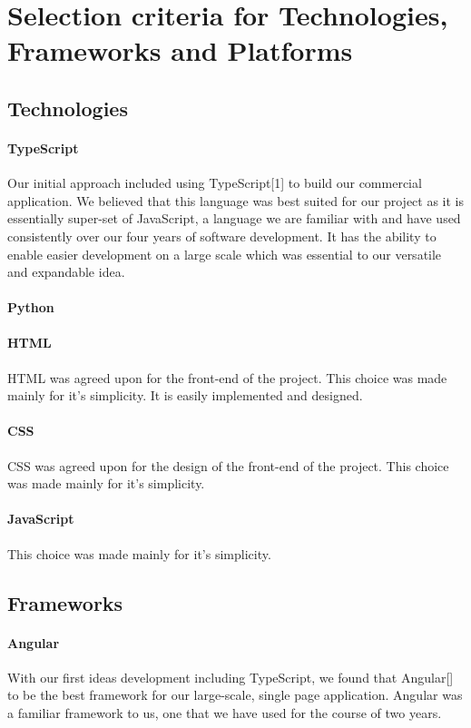 \section{Selection criteria for Technologies, Frameworks and Platforms}

\subsection{Technologies}
\paragraph{TypeScript}
Our initial approach included using TypeScript[1] to build our commercial application. We believed that this language was best suited for our project as it is essentially super-set of JavaScript, a language we are familiar with and have used consistently over our four years of software development. It has the ability to enable easier development on a large scale which was essential to our versatile and expandable idea\cite{bierman_abadi_torgersen_2014}.

\paragraph{Python}


\paragraph{HTML}
HTML was agreed upon for the front-end of the project. This choice was made mainly for it's simplicity. It is easily implemented and designed.

\paragraph{CSS}
CSS was agreed upon for the design of the front-end of the project. This choice was made mainly for it's simplicity.

\paragraph{JavaScript}
This choice was made mainly for it's simplicity.

\subsection{Frameworks}
\paragraph{Angular}
With our first ideas development including TypeScript, we found that Angular[] to be the best framework for our large-scale, single page application. Angular was a familiar framework to us, one that we have used for the course of two years.

